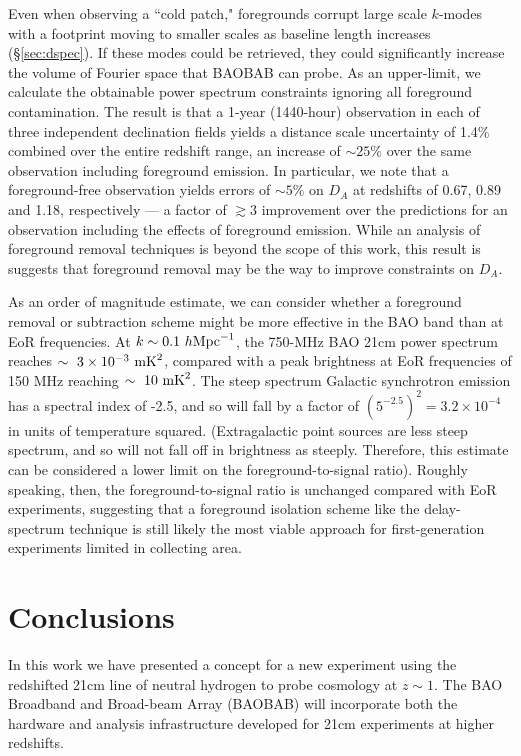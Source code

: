 \documentclass[10pt,iop]{emulateapj}
\begin{document}
Even when observing a ``cold patch," foregrounds corrupt large scale $k$-modes with a 
footprint moving to smaller scales as baseline length increases (\S\ref{sec:dspec}).  If these
modes could be retrieved, they could significantly increase the volume of Fourier space
that BAOBAB can probe.  As an upper-limit, we calculate the obtainable power spectrum constraints 
ignoring all foreground contamination.  The result is that a 1-year (1440-hour) observation
in each of three independent declination fields
yields a distance scale uncertainty of 1.4\% combined over the entire redshift range, an increase of $\sim25\%$
over the same observation including foreground emission.  
In particular, we note that a foreground-free observation yields
errors of $\sim5\%$ on $D_A$ at redshifts of 0.67, 0.89 and 1.18, respectively --- 
a factor of $\gtrsim3$ improvement over the predictions for an observation including the effects of foreground emission.
While
an analysis of foreground removal techniques is beyond the scope of this work, 
this result is
suggests that foreground removal may be the way to improve constraints on $D_A$.

As an order of magnitude estimate, we can  consider whether a foreground 
removal or
subtraction scheme might be more effective in the BAO band than at EoR frequencies.  At 
$k\sim0.1~h\rm{Mpc}^{-1}$, the 750-MHz BAO 21cm power spectrum reaches $\sim~3\times10^{-3}~\rm{mK}^2$,
compared with a peak brightness at EoR frequencies of 150 MHz reaching $\sim~10~\rm{mK}^2$.  
The steep spectrum Galactic synchrotron emission has a spectral index of -2.5, and so will fall
by a factor of $(5^{-2.5})^2 = 3.2\times10^{-4}$ in units of temperature squared.  (Extragalactic point sources are
less steep spectrum, and so will not fall off in brightness as steeply.  Therefore, this estimate
can be considered a lower limit on the foreground-to-signal ratio).  
Roughly speaking, then, the foreground-to-signal ratio is unchanged compared with EoR experiments,
suggesting
that a foreground isolation scheme like the delay-spectrum technique is still likely
the most viable approach for first-generation experiments limited in collecting area.


\section{Conclusions}
\label{sec:conclusions}

In this work we have presented a concept for a new experiment using the redshifted 21cm 
line of neutral hydrogen to probe cosmology at $z\sim1$.  The BAO Broadband and Broad-beam
Array (BAOBAB) will incorporate both the hardware and analysis infrastructure developed for
21cm experiments at higher redshifts.
\end{document}

